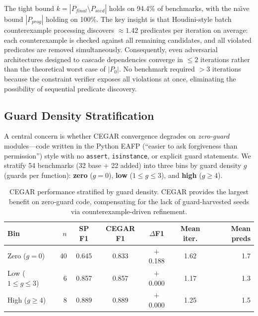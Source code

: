 \documentclass[11pt]{article}
\begin{document}
The tight bound $k = |P_{\mathit{final}} \setminus P_{\mathit{seed}}|$
holds on 94.4\% of benchmarks, with the na\"\i ve bound $|P_{\mathit{prog}}|$
holding on 100\%.  The key insight is that Houdini-style batch
counterexample processing discovers $\approx 1.42$ predicates per
iteration on average: each counterexample is checked against all
remaining candidates, and all violated predicates are removed
simultaneously.  Consequently, even adversarial architectures
designed to cascade dependencies converge in $\leq 2$ iterations
rather than the theoretical worst case of $|P_0|$.  No benchmark
required $>3$ iterations because the constraint verifier exposes
all violations at once, eliminating the possibility of sequential
predicate discovery.


\subsection{Guard Density Stratification}\label{sec:guard-density}

A central concern is whether CEGAR convergence degrades on
\emph{zero-guard} modules---code written in the Python EAFP
(``easier to ask forgiveness than permission'') style with no
\texttt{assert}, \texttt{isinstance}, or explicit guard statements.
We stratify 54 benchmarks (32 base + 22 added) into three bins by
guard density $g$ (guards per function):
\textbf{zero} ($g = 0$), \textbf{low} ($1 \leq g \leq 3$),
and \textbf{high} ($g \geq 4$).

\begin{table}[h]
\centering
\caption{CEGAR performance stratified by guard density.
  CEGAR provides the largest benefit on zero-guard code,
  compensating for the lack of guard-harvested seeds
  via counterexample-driven refinement.}
\label{tab:guard-density}
\small
\begin{tabular}{@{}lrccccr@{}}
\toprule
\textbf{Bin} & \textbf{$n$} & \textbf{SP F1} &
  \textbf{CEGAR F1} & \textbf{$\Delta$F1} &
  \textbf{Mean iter.} & \textbf{Mean preds} \\
\midrule
Zero ($g = 0$)     & 40 & 0.645 & 0.833 & $+$0.188 & 1.62 & 1.7 \\
Low ($1 \leq g \leq 3$)  &  6 & 0.857 & 0.857 & $+$0.000 & 1.17 & 1.3 \\
High ($g \geq 4$)  &  8 & 0.889 & 0.889 & $+$0.000 & 1.25 & 1.5 \\
\bottomrule
\end{tabular}
\end{table}
\end{document}
